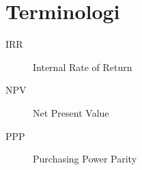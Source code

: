 \section{Terminologi}
\begin{description}
    \item[IRR] Internal Rate of Return
    \item[NPV] Net Present Value
    \item[PPP] Purchasing Power Parity
\end{description}